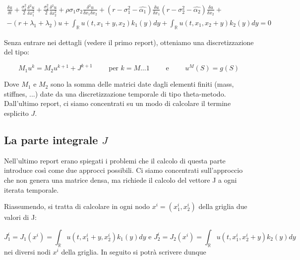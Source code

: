 \documentclass[a4paper,10pt]{article}
\newcommand{\der}[2]{\frac{\delta #1}{\delta #2}}
\newcommand{\dder}[2]{\frac{\delta^2 #1}{\delta #2^2}}
\newcommand{\dmix}[3]{\frac{\delta^2 #1}{\delta #2 \delta #3}}
\begin{document}
{
\small
\begin{multline}
 \der{u}{t}+\frac{\sigma_1^2}{2}\dder{u}{x_1}+\frac{\sigma_2^2}{2}\dder{u}{x_2}+\rho\sigma_1\sigma_2\dmix{u}{x_1}{x_2}+
 \left(r-\sigma_1^2-\hat{\alpha_1}\right)\der{u}{x_1}
 \left(r-\sigma_2^2-\hat{\alpha_2}\right)\der{u}{x_2}+\\-(r+\lambda_1+\lambda_2)u+
 \int_\mathbb{R}u(t,x_1+y,x_2)k_1(y)dy+
 \int_\mathbb{R}u(t,x_1,x_2+y)k_2(y)dy=0
 \label{eq:costcoeff2}
\end{multline}
}


Senza entrare nei dettagli (vedere il primo report), otteniamo una discretizzazione del tipo:

\begin{equation}
 M_1u^k=M_2u^{k+1}+J^{k+1}  \qquad \text{ per } k=M\dots1 \qquad \text{ e } \qquad u^{M}(S)=g(S) 
\end{equation}

Dove $M_1$ e $M_2$ sono la somma delle matrici date dagli elementi finiti (mass, stiffnes, ...) date da una discretizzazione temporale di tipo theta-metodo. Dall'ultimo report, ci siamo concentrati su un modo di calcolare il termine esplicito $J$.

\subsection{La parte integrale $J$}

Nell'ultimo report erano spiegati i problemi che il calcolo di questa parte introduce così come due approcci possibili. Ci siamo concentrati sull'approccio che non genera una matrice densa, ma richiede il calcolo del vettore J a ogni iterata temporale.

Riassumendo, si tratta di calcolare in ogni nodo $x^i=(x_1^i,x_2^i)$ della griglia due valori di J: 

\begin{equation*}
 J_1^i=J_1(x^i)=\int_\mathbb{R}u(t,x_1^i+y,x_2^i)k_1(y)dy \text{ e } J_2^i=J_2(x^i)=\int_\mathbb{R}u(t,x_1^i,x_2^i+y)k_2(y)dy
\end{equation*}
nei diversi nodi $x^i$ della griglia. In seguito si potrà scrivere dunque 
\end{document}
